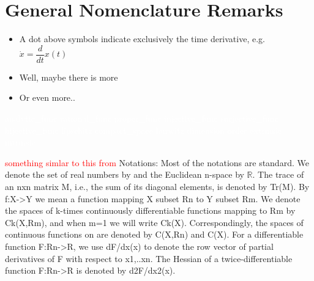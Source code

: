 \section*{General Nomenclature Remarks}
\vspace{0.1cm}
\begin{itemize}
\item A dot above symbols indicate exclusively the time derivative, e.g. $\dot{x} = \dfrac{d}{dt}x(t)$
\item Well, maybe there is more
\item Or even more..
\end{itemize}

\textcolor{white}{\gls{analytic_func} \gls{rational_func} \gls{proper_func} \gls{injective_func} \gls{surjective_func} \gls{bijective_func} \gls{lipschitz} \gls{compact_space} \gls{hurwitz} \gls{dimension} \gls{order} \gls{extrinsic} \gls{intrinsic}}


\textcolor{red}{something simlar to this from \citep{bib:barrier_prajna}}
Notations: Most of the notations are standard. We denote
the set of real numbers by and the Euclidean n-space by $\mathbb{R}$.
The trace of an nxn matrix M, i.e., the sum of its diagonal elements,
is denoted by Tr(M). By f:X->Y we mean a function
mapping X subset Rn to Y subset Rm. We denote the spaces of
k-times continuously differentiable functions mapping
to Rm by Ck(X,Rm), and when m=1 we will write Ck(X).
Correspondingly, the spaces of continuous functions on are
denoted by C(X,Rn) and C(X). For a differentiable function
F:Rn->R, we use dF/dx(x) to denote the row vector
of partial derivatives of F with respect to x1,..xn. The Hessian
of a twice-differentiable function F:Rn->R is denoted
by d2F/dx2(x).